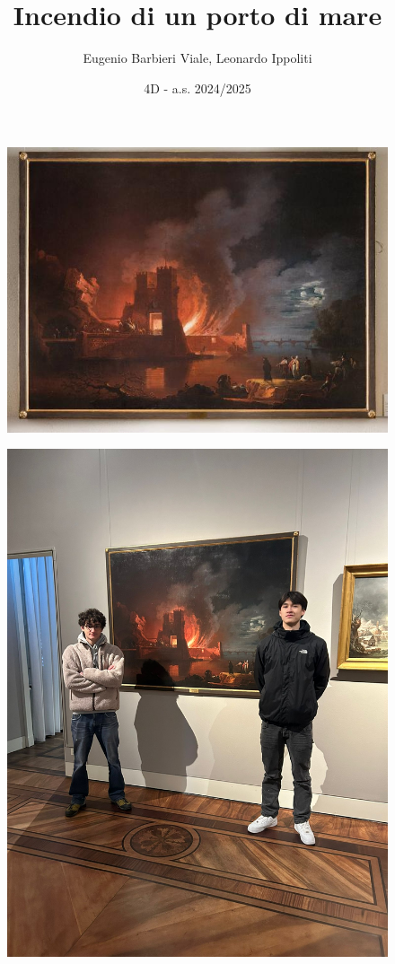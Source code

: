 \documentclass[12pt]{article}
\title{Incendio di un porto di mare}
\author{Eugenio Barbieri Viale, Leonardo Ippoliti}
\date{4D - a.s. 2024/2025}
\begin{document}
\setlength{\parindent}{0pt}
\maketitle

\begin{figure}[ht]
    \includegraphics[scale=0.6]{dipinto}
    \centering
\end{figure}

\begin{figure}[h]
    \includegraphics[scale=0.03]{selfie}
    \centering
\end{figure}
\end{document}
